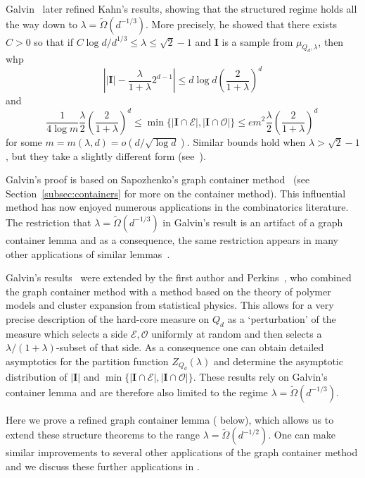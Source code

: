 \documentclass[10pt,a4paper]{amsart}
\theoremstyle{definition}
\newcommand{\cO}{\mathcal{O} }
\newcommand{\cE}{\mathcal{E} }
\newcommand{\0}[0]{\emptyset}
\newcommand{\lam}{\lambda}
\begin{document}
Galvin~\cite{galvin_threshold} later refined Kahn's results, showing that the structured regime holds all the way down to $\lam=\tilde \Omega(d^{-1/3})$. More precisely, he showed that there exists $C>0$ so that if $ C \log d/d^{1/3}\leq \lam \leq \sqrt{2}-1$ and $\mathbf I$ is a sample from $\mu_{Q_d,\lam}$, then whp
\[
\left||\mathbf I| - \frac{\lam}{1+\lam}2^{d-1} \right|\leq d \log d \left(\frac{2}{1+\lam} \right)^d
\]
and 
\[
\frac{1}{4 \log m}\frac{\lam}{2}\left(\frac{2}{1+\lam} \right)^d\leq \min\{|\mathbf I \cap \cE|, |\mathbf I \cap \cO |\}\leq em^2\frac{\lam}{2}\left(\frac{2}{1+\lam} \right)^d\, 
\]
for some $m=m(\lam,d)=o(d/\sqrt{\log d})$. Similar bounds hold when $\lam>\sqrt{2}-1$, but they take a slightly different form (see~\cite[Theorem 1.1]{galvin_threshold}). 

 Galvin's proof is based on Sapozhenko's graph container method~\cite{sapocontainer} (see Section~\ref{subsec:containers} for more on the container method). This influential method has now enjoyed numerous applications in the combinatorics literature. The restriction that $\lam=\tilde \Omega(d^{-1/3})$ in Galvin's result is an artifact of a graph container lemma and as a consequence, the same restriction appears in many other applications of similar lemmas~\cite{balogh2021independent,galvin2006slow,struct,jenssen2023approximately,kronenberg2022independent}.

 Galvin's results~\cite{galvin_threshold} were extended by the first author and Perkins~\cite{hypercube}, who combined the graph container method with a method based on the theory of polymer models and cluster expansion from statistical physics. This allows for a very precise description of the hard-core measure on $Q_d$ as a `perturbation' of the measure which selects a side $\cE,\cO$ uniformly at random and then selects a $\lam/(1+\lam)$-subset of that side. As a consequence one can obtain detailed asymptotics for the partition function $Z_{Q_d}(\lam)$ and determine the asymptotic distribution of $|\mathbf I|$ and $\min\{|\mathbf I \cap \cE|, |\mathbf I \cap \cO |\}$. These results rely on Galvin's container lemma and are therefore also limited to the regime $\lam=\tilde\Omega(d^{-1/3})$.


Here we prove a refined graph container lemma ( below), which allows us to extend these structure theorems to the range $\lam=\tilde \Omega(d^{-1/2})$. One can make similar improvements to several other applications of the graph container method and we discuss these further applications in . 
\end{document}
